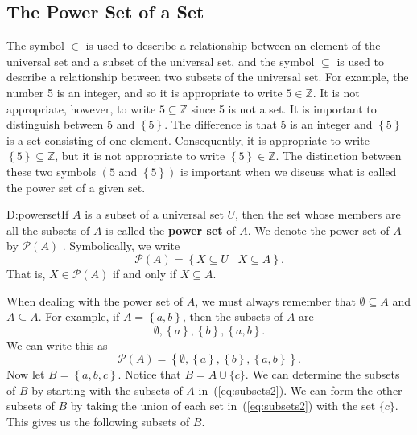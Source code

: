 \subsection*{The Power Set of a Set}
The symbol  $ \in $  is used to describe a relationship between an element of the universal set and a subset of the universal set, and the symbol  $ \subseteq $  is used to describe a relationship between two subsets of the universal set.  For example, the number 5 is an integer, and so it is appropriate to write  $5 \in \mathbb{Z}$.  It is not appropriate, however, to write  $5 \subseteq \mathbb{Z}$ since 5 is not a set.  It is important to distinguish between 5 and $\left\{ 5 \right\}$.  The difference is that 5 is an integer and $\left\{ 5 \right\}$ is a set consisting of one element.  Consequently, it is appropriate to write  
$\left\{ 5 \right\} \subseteq \mathbb{Z}$, but it is not appropriate to write  
$\left\{ 5 \right\} \in \mathbb{Z}$.  The distinction between these two symbols 
$\left( 5 \text{ and } \left\{ 5 \right\} \right)$ is important when we discuss what is called the power set of a given set.
%
\begin{defbox}{D:powerset}{If  $A$  is a subset of a universal set  $U$, then the set whose members are all the subsets of  $A$  is called the \textbf{power set}
%
%
 of  $A$.  We denote the power set of  $A$  by  $\mathcal{P}( A )$ 
\label{sym:powerset}.  Symbolically, we write
\[
\mathcal{P}( A ) = \left\{ {X \subseteq U  \mid X \subseteq A} \right\}.
\]
That is,  $X \in \mathcal{P}( A )$  if and  only if  $X \subseteq A$.}
\end{defbox}
When dealing with the power set of  $A$, we must always remember that  $\emptyset  \subseteq A$
and  $A \subseteq A$.  %
%
%
For example, if  $A = \left\{ {a,b} \right\}$, then the subsets of  $A$  are
\begin{equation} \label{eq:subsets2}
\emptyset,\left\{ a \right\}\!,\left\{ b \right\}\!,\left\{ {a,b} \right\}\!.
\end{equation}
 We can write this as
\[
\mathcal{P}( A ) = \left\{ {\emptyset,\left\{ a \right\}\!,\left\{ b \right\}\!,\left\{ {a,b} \right\}} \right\}\!.
\]
Now let $B = \left\{ {a, b, c} \right\}$.  Notice that $B = A \cup \{ c \}$.  We can determine the subsets of $B$ by starting with the subsets of $A$ in~(\ref{eq:subsets2}).  We can form the other subsets of $B$ by taking the union of each set in~(\ref{eq:subsets2}) with the set $\{c \}$.  This gives us the following subsets of $B$.
